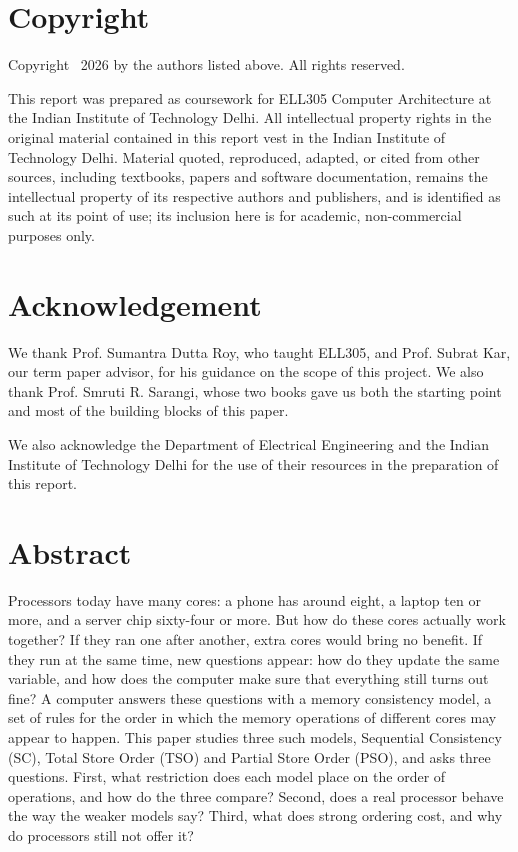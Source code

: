 \chapter*{Copyright}
Copyright \textcopyright\ 2026 by the authors listed above. All rights reserved.

This report was prepared as coursework for ELL305 Computer Architecture at the Indian Institute of Technology Delhi. All intellectual property rights in the original material contained in this report vest in the Indian Institute of Technology Delhi. Material quoted, reproduced, adapted, or cited from other sources, including textbooks, papers and software documentation, remains the intellectual property of its respective authors and publishers, and is identified as such at its point of use; its inclusion here is for academic, non-commercial purposes only.

\chapter*{Acknowledgement}
We thank Prof. Sumantra Dutta Roy, who taught ELL305, and Prof. Subrat Kar, our term paper advisor, for his guidance on the scope of this project. We also thank Prof. Smruti R. Sarangi, whose two books gave us both the starting point and most of the building blocks of this paper.

We also acknowledge the Department of Electrical Engineering and the Indian Institute of Technology Delhi for the use of their resources in the preparation of this report.


\chapter*{Abstract}
Processors today have many cores: a phone has around eight, a laptop ten or more, and a server chip sixty-four or more. But how do these cores actually work together? If they ran one after another, extra cores would bring no benefit. If they run at the same time, new questions appear: how do they update the same variable, and how does the computer make sure that everything still turns out fine? A computer answers these questions with a memory consistency model, a set of rules for the order in which the memory operations of different cores may appear to happen. This paper studies three such models, Sequential Consistency (SC), Total Store Order (TSO) and Partial Store Order (PSO), and asks three questions. First, what restriction does each model place on the order of operations, and how do the three compare? Second, does a real processor behave the way the weaker models say? Third, what does strong ordering cost, and why do processors still not offer it?

